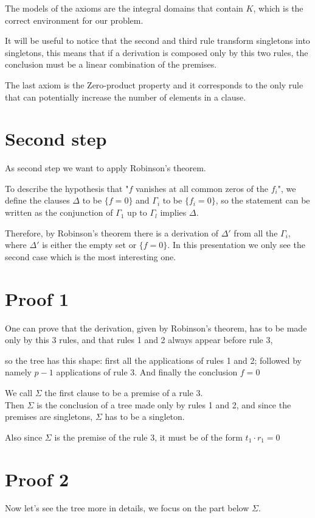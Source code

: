 \documentclass[12pt,a4paper,oneside]{article}
\begin{document}
The models of the axioms are the integral domains that contain $K$, which is the correct environment for our problem. 

It will be useful to notice that the second and third rule transform singletons into singletons, this means  that if a derivation is composed only by this two rules, the conclusion must be a linear combination of the premises.

The last axiom is the Zero-product property and it corresponds to the only rule that can potentially increase the number of elements in a clause.

\newpage\section{Second step}
As second step we want to apply Robinson's theorem.

To describe the hypothesis that  "$f$  vanishes at all common zeros of the $f_i$", we define the clauses $\Delta$ to be $\{f=0\}$ and $\Gamma_i$ to be $\{f_i=0\}$, so the statement can be written as the conjunction of  $\Gamma_1$ up to $\Gamma_l$ implies $\Delta$. 

Therefore, by Robinson's theorem there is a derivation of $\Delta'$ from all the  $\Gamma_i$, where $\Delta'$ is either the empty set or  $\{f=0\}$. In this presentation we only see  the second case which is the most interesting one.
 
 
\section{Proof 1}
One can prove that the derivation, given by Robinson's theorem, has to be made only by this 3 rules,
and that rules 1 and 2 always appear before rule 3, 

so the tree has this shape: first all the applications of rules 1 and 2; followed by namely $p-1$ applications of rule 3. And finally the conclusion $f=0$

We call $\Sigma$ the first clause to be a premise of a rule 3. 
\\Then $\Sigma$ is the conclusion of a tree made only by rules 1 and 2, and since the premises are singletons, $\Sigma$ has to be a singleton. 

Also since $\Sigma$ is the premise of the rule 3, it must be of the form $t_1\cdot r_1=0$

\section{Proof 2}
Now let's see the tree more in details, we focus on the part below $\Sigma$.
\end{document}
